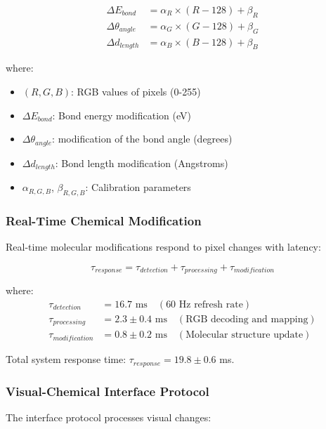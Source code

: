 \documentclass[12pt,a4paper]{article}
\begin{document}
\begin{align}
\Delta E_{bond} &= \alpha_R \times (R - 128) + \beta_R \\
\Delta \theta_{angle} &= \alpha_G \times (G - 128) + \beta_G \\
\Delta d_{length} &= \alpha_B \times (B - 128) + \beta_B
\end{align}

where:
\begin{itemize}
\item $(R, G, B)$: RGB values of pixels (0-255)
\item $\Delta E_{bond}$: Bond energy modification (eV)
\item $\Delta \theta_{angle}$: modification of the bond angle (degrees)
\item $\Delta d_{length}$: Bond length modification (Angstroms)
\item $\alpha_{R,G,B}$, $\beta_{R,G,B}$: Calibration parameters
\end{itemize}

\subsubsection{Real-Time Chemical Modification}

Real-time molecular modifications respond to pixel changes with latency:

\begin{equation}
\tau_{response} = \tau_{detection} + \tau_{processing} + \tau_{modification}
\end{equation}

where:
\begin{align}
\tau_{detection} &= 16.7 \text{ ms} \quad (\text{60 Hz refresh rate}) \\
\tau_{processing} &= 2.3 \pm 0.4 \text{ ms} \quad (\text{RGB decoding and mapping}) \\
\tau_{modification} &= 0.8 \pm 0.2 \text{ ms} \quad (\text{Molecular structure update})
\end{align}

Total system response time: $\tau_{response} = 19.8 \pm 0.6$ ms.

\subsubsection{Visual-Chemical Interface Protocol}

The interface protocol processes visual changes:
\end{document}
